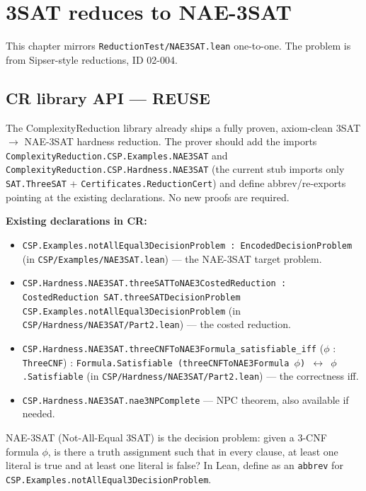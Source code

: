 
\section{3SAT reduces to NAE-3SAT}
\label{sec:nae3sat}

This chapter mirrors \texttt{ReductionTest/NAE3SAT.lean} one-to-one.
The problem is from Sipser-style reductions, ID 02-004.

\subsection*{CR library API --- REUSE}

The ComplexityReduction library already ships a fully proven, axiom-clean
3SAT $\to$ NAE-3SAT hardness reduction. The prover should add the imports
\texttt{ComplexityReduction.CSP.Examples.NAE3SAT} and
\texttt{ComplexityReduction.CSP.Hardness.NAE3SAT} (the current stub imports
only \texttt{SAT.ThreeSAT} + \texttt{Certificates.ReductionCert}) and define
abbrev/re-exports pointing at the existing declarations. No new proofs are
required.

\textbf{Existing declarations in CR:}
\begin{itemize}
  \item \texttt{CSP.Examples.notAllEqual3DecisionProblem : EncodedDecisionProblem}
    (in \texttt{CSP/Examples/NAE3SAT.lean}) --- the NAE-3SAT target problem.
  \item \texttt{CSP.Hardness.NAE3SAT.threeSATToNAE3CostedReduction :
    CostedReduction SAT.threeSATDecisionProblem
    CSP.Examples.notAllEqual3DecisionProblem}
    (in \texttt{CSP/Hardness/NAE3SAT/Part2.lean}) --- the costed reduction.
  \item \texttt{CSP.Hardness.NAE3SAT.threeCNFToNAE3Formula\_satisfiable\_iff}
    ($\phi$ : \texttt{ThreeCNF}) :
    \texttt{Formula.Satisfiable (threeCNFToNAE3Formula $\phi$)
    $\leftrightarrow$ $\phi$.Satisfiable}
    (in \texttt{CSP/Hardness/NAE3SAT/Part2.lean}) --- the correctness iff.
  \item \texttt{CSP.Hardness.NAE3SAT.nae3NPComplete} --- NPC theorem, also
    available if needed.
\end{itemize}

\begin{definition}
  \label{def:nae3sat}
 \mathlibok
 NAE-3SAT (Not-All-Equal 3SAT) is the decision problem: given a 3-CNF
  formula $\phi$, is there a truth assignment such that in every clause,
  at least one literal is true and at least one literal is false?
  In Lean, define as an \texttt{abbrev} for
  \texttt{CSP.Examples.notAllEqual3DecisionProblem}.
\end{definition}

